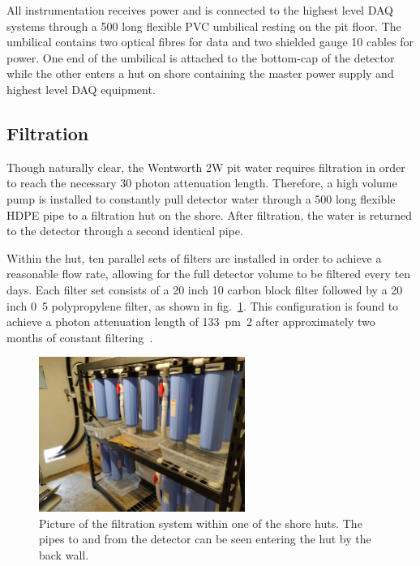 All \chipsfive instrumentation receives power and is connected to the highest level DAQ systems
through a \unit{500}{} long flexible PVC umbilical resting on the pit floor. The
umbilical contains two optical fibres for data and two shielded gauge 10 cables for power. One end
of the umbilical is attached to the bottom-cap of the detector while the other enters a hut on
shore containing the master power supply and highest level DAQ equipment.

\subsection{Filtration} %
\label{sec:chips_detector_water} %

Though naturally clear, the Wentworth 2W pit water requires filtration in order to reach the
necessary \unit{30}{} photon attenuation length. Therefore, a high volume pump is
installed to constantly pull detector water through a \unit{500}{} long flexible HDPE
pipe to a filtration hut on the shore. After filtration, the water is returned to the detector
through a second identical pipe.

Within the hut, ten parallel sets of filters are installed in order to achieve a reasonable flow
rate, allowing for the full detector volume to be filtered every ten days. Each filter set
consists of a 20 inch \unit{10}{\mu{}} carbon block filter followed by a 20 inch
\unit{0.5}{\mu{}} polypropylene filter, as shown in fig.~\ref{fig:filtration}. This
configuration is found to achieve a photon attenuation length of \unit{133\pm2}{} after
approximately two months of constant filtering~\cite{campbell2020}.

\begin{figure} %
    \includegraphics[width=0.6\textwidth]{diagrams/4-chips/filtration.jpg}
    \caption[Picture of the \chipsfive filtration system]
    {Picture of the \chipsfive filtration system within one of the shore huts. The pipes to and
        from the detector can be seen entering the hut by the back wall.}
    \label{fig:filtration}
\end{figure}

